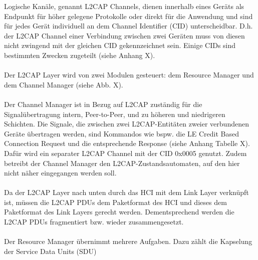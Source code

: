 Logische Kanäle, genannt L2CAP Channels, dienen innerhalb eines Geräts als Endpunkt für höher gelegene Protokolle oder direkt für die Anwendung und sind für jedes Gerät individuell an dem Channel Identifier (CID) unterscheidbar. D.h. der L2CAP Channel einer Verbindung zwischen zwei Geräten muss von diesen nicht zwingend mit der gleichen CID gekennzeichnet sein. Einige CIDs sind bestimmten Zwecken zugeteilt (siehe Anhang X).
\\\\
Der L2CAP Layer wird von zwei Modulen gesteuert: dem Resource Manager und dem Channel Manager (siehe Abb. X).
\\\\
Der Channel Manager ist in Bezug auf L2CAP zuständig für die Signalübertragung intern, Peer-to-Peer, und zu höheren und niedrigeren Schichten.
Die Signale, die zwischen zwei L2CAP-Entitäten zweier verbundenen Geräte übertragen werden, sind Kommandos wie bspw. die LE Credit Based Connection Request und die entsprechende Response (siehe Anhang Tabelle X). 
Dafür wird ein separater L2CAP Channel mit der CID 0x0005 genutzt. Zudem betreibt der Channel Manager den L2CAP-Zustandsautomaten, auf den hier nicht näher eingegangen werden soll.
\\\\
Da der L2CAP Layer nach unten durch das HCI mit dem Link Layer verknüpft ist, müssen die L2CAP PDUs dem Paketformat des HCI und dieses dem Paketformat des Link Layers gerecht werden. Dementsprechend werden die L2CAP PDUs fragmentiert bzw. wieder zusammengesetzt.
\\\\
Der Resource Manager übernimmt mehrere Aufgaben. Dazu zählt die Kapselung der Service Data Units (SDU)






